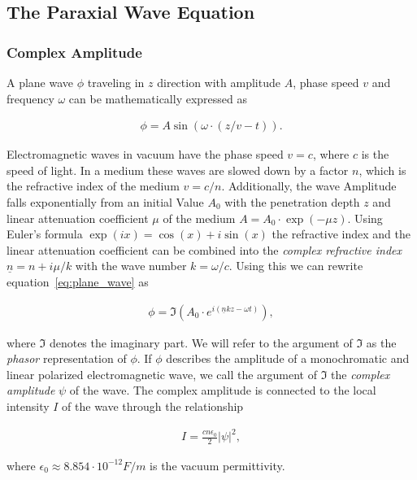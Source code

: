 

\subsection{The Paraxial Wave Equation}

\subsubsection{Complex Amplitude} \label{sec:phasors}

A plane wave $\phi$ traveling in $z$ direction with amplitude $A$, phase speed $v$ and frequency $\omega$ can be mathematically expressed as

\begin{align} \label{eq:plane_wave}
\phi = A \sin(\omega \cdot (z/v - t) ).
\end{align}

Electromagnetic waves in vacuum have the phase speed $v = c$, where $c$ is the speed of light. In a medium these waves are slowed down by a factor $n$, which is the refractive index of the medium $v = c/n$. Additionally, the wave Amplitude falls exponentially from an initial Value $A_0$ with the penetration depth $z$ and linear attenuation coefficient $\mu$ of the medium $A = A_0 \cdot \exp(- \mu z)$. Using Euler's formula $\exp(ix) = \cos(x) + i \sin(x)$ the refractive index and the linear attenuation coefficient can be combined into the \emph{complex refractive index} $\underline n = n + i \mu  / k$ with the wave number $k = \omega/c$. Using this we can rewrite equation~\eqref{eq:plane_wave} as

\begin{align*}
\phi = \Im \mathopen{} \left( A_0 \cdot e^{ i (\underline n k z - \omega t) } \right) \mathclose{},
\end{align*}

where $\Im$ denotes the imaginary part. We will refer to the argument of $\Im$ as the \emph{phasor} representation of $\phi$. If $\phi$ describes the amplitude of a monochromatic and linear polarized electromagnetic wave, we call the argument of $\Im$ the \emph{complex amplitude} $\psi$ of the wave. The complex amplitude is connected to the local intensity $I$ of the wave through the relationship~\cite{wiki:intensity}

\begin{align*}
I = \frac{c n \epsilon_0}{2} |\psi|^2,
\end{align*}

where $\epsilon_0 \approx 8.854 \cdot 10^{-12} F/m$ is the vacuum permittivity.


